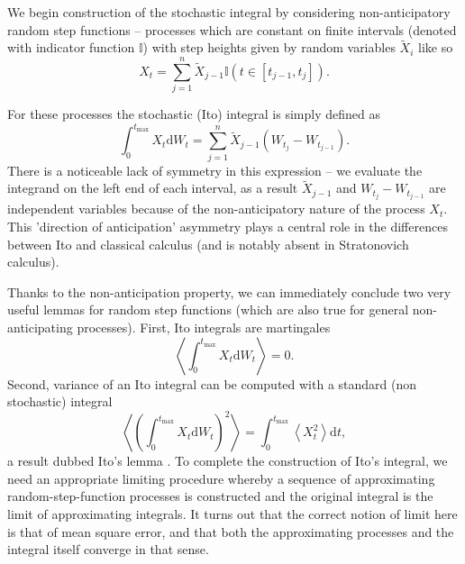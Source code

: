 \documentclass{doctoral}
\newcommand{\dd}{\mathrm{d}}
\begin{document}
We begin construction of the stochastic integral by considering non-anticipatory random step functions -- processes which are constant on finite intervals (denoted with indicator function $\mathbb{I}$) with step heights given by random variables $\widetilde{X}_{i}$ like so
\begin{equation}
    X_t = \sum_{j=1}^{n} \widetilde{X}_{j-1} \mathbb{I}(t \in [t_{j-1},t_j]).
    \label{eqn:random-step-function}
\end{equation}

For these processes the stochastic (Ito) integral is simply defined as
\begin{equation}
    \int_0^{t_{\mathrm{max}}} X_t \dd W_t = \sum_{j=1}^{n} \widetilde{X}_{j-1} (W_{t_j} - W_{t_{j-1}}).
    \label{eqn:ito-integral-step-function}
\end{equation}
There is a noticeable lack of symmetry in this expression -- we evaluate the integrand on the left end of each interval, as a result $\widetilde{X}_{j-1}$ and $W_{t_j} - W_{t_{j-1}}$ are independent variables because of the non-anticipatory nature of the process $X_t$.
This 'direction of anticipation' asymmetry plays a central role in the differences between Ito and classical calculus (and is notably absent in Stratonovich calculus).

Thanks to the non-anticipation property, we can immediately conclude two very useful lemmas for random step functions (which are also true for general non-anticipating processes).
First, Ito integrals are martingales
\begin{equation}
    \left< \int_0^{t_{\mathrm{max}}} X_t \dd W_t \right> = 0.
    \label{eqn:ito-integrals-are-martingales}
\end{equation}
Second, variance of an Ito integral can be computed with a standard (non stochastic) integral
\begin{equation}
    \left< \left( \int_0^{t_{\mathrm{max}}} X_t \dd W_t \right)^2 \right> = \int_{0}^{t_{\mathrm{max}}} \left< X_t^2 \right> \dd t, \label{eqn:itos-lemma}
\end{equation}
a result dubbed Ito's lemma \cite{Ito_1951}.
To complete the construction of Ito's integral, we need an appropriate limiting procedure whereby a sequence of approximating random-step-function processes is constructed and the original integral is the limit of approximating integrals.
It turns out that the correct notion of limit here is that of mean square error, and that both the approximating processes and the integral itself converge in that sense.
\end{document}
